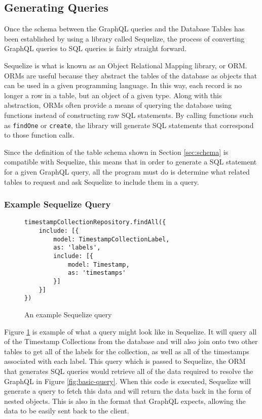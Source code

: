 \subsection{Generating Queries}

Once the schema between the GraphQL queries and the Database Tables has been established by using a library called Sequelize, the process of converting GraphQL queries to SQL queries is fairly straight forward.

Sequelize is what is known as an Object Relational Mapping library, or ORM.  ORMs are useful because they abstract the tables of the database as objects that can be used in a given programming language.  In this way, each record is no longer a row in a table, but an object of a given type.  Along with this abstraction, ORMs often provide a means of querying the database using functions instead of constructing raw SQL statements.  By calling functions such as \Verb!findOne! or \Verb!create!, the library will generate SQL statements that correspond to those function calls.

Since the definition of the table schema shown in Section \ref{sec:schema} is compatible with Sequelize, this means that in order to generate a SQL statement for a given GraphQL query, all the program must do is determine what related tables to request and ask Sequelize to include them in a query.

\subsubsection{Example Sequelize Query}

\begin{figure}
    \begin{verbatim}
timestampCollectionRepository.findAll({
    include: [{
        model: TimestampCollectionLabel,
        as: 'labels',
        include: [{
            model: Timestamp,
            as: 'timestamps'
        }]
    }]
})
    \end{verbatim}
    \caption{An example Sequelize query}
    \label{fig:sequelize-query}
\end{figure}

Figure \ref{fig:sequelize-query} is example of what a query might look like in Sequelize.  It will query all of the Timestamp Collections from the database and will also join onto two other tables to get all of the labels for the collection, as well as all of the timestamps associated with each label.  This query which is passed to Sequelize, the ORM that generates SQL queries would retrieve all of the data required to resolve the GraphQL in Figure \ref{fig:basic-query}.  When this code is executed, Sequelize will generate a query to fetch this data and will return the data back in the form of nested objects.  This is also in the format that GraphQL expects, allowing the data to be easily sent back to the client.

